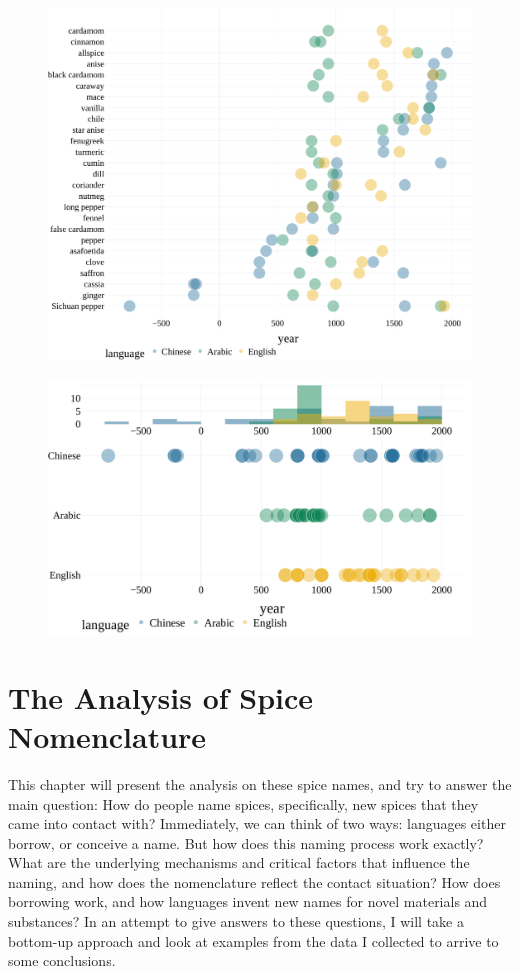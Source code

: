 \begin{figure}[!ht]
  \centering
  \includegraphics[width=\linewidth]{imgs/plots/attestation.pdf}
  \caption{}
  \label{fig:set_all}
\end{figure}

\begin{figure}[!ht]
  \centering
  \includegraphics[width=\linewidth]{imgs/plots/attestation_compact.pdf}
  \caption{}
  \label{fig:set_all}
\end{figure}

\section{The Analysis of Spice Nomenclature}

This chapter will present the analysis on these spice names, and try to answer the main question: How do people name spices, specifically, new spices that they came into contact with? Immediately, we can think of two ways: languages either borrow, or conceive a name. But how does this naming process work exactly? What are the underlying mechanisms and critical factors that influence the naming, and how does the nomenclature reflect the contact situation? How does borrowing work, and how languages invent new names for novel materials and substances? In an attempt to give answers to these questions, I will take a bottom-up approach and look at examples from the data I collected to arrive to some conclusions.

